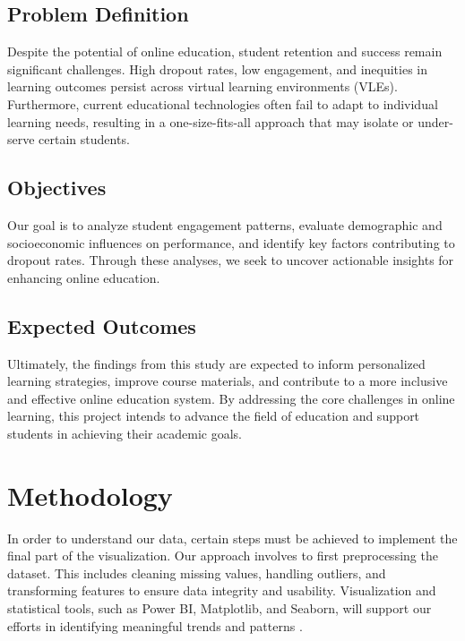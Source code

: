 \subsection*{Problem Definition}

Despite the potential of online education, student retention and success remain significant challenges. High dropout rates, low engagement, and inequities in learning outcomes persist across virtual learning environments (VLEs). Furthermore, current educational technologies often fail to adapt to individual learning needs, resulting in a one-size-fits-all approach that may isolate or under-serve certain students.

\subsection*{Objectives}

Our goal is to analyze student engagement patterns, evaluate demographic and socioeconomic influences on performance, and identify key factors contributing to dropout rates. Through these analyses, we seek to uncover actionable insights for enhancing online education.

\subsection*{Expected Outcomes}

Ultimately, the findings from this study are expected to inform personalized learning strategies, improve course materials, and contribute to a more inclusive and effective online education system. By addressing the core challenges in online learning, this project intends to advance the field of education and support students in achieving their academic goals.




\section{Methodology}

In order to understand our data, certain steps must be achieved to implement the final part of the visualization. Our approach involves to first preprocessing the dataset. This includes cleaning missing values, handling outliers, and transforming features to ensure data integrity and usability. Visualization and statistical tools, such as Power BI, Matplotlib, and Seaborn, will support our efforts in identifying meaningful trends and patterns \cite{Hunter2007, Waskom2021}.

